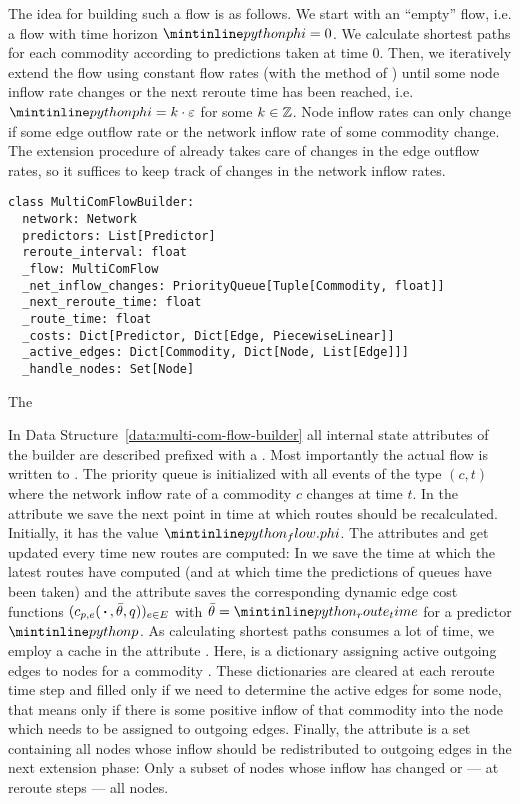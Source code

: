 The idea for building such a flow is as follows.
We start with an ``empty'' flow, i.e. a flow with time horizon $\code{phi}=0$.
We calculate shortest paths for each commodity according to predictions taken at time $0$.
Then, we iteratively extend the flow using constant flow rates (with the  method of )
until some node inflow rate changes or the next reroute time has been reached, i.e. $\code{phi} = k\cdot \varepsilon$ for some $k\in \mathbb{Z}$.
Node inflow rates can only change if some edge outflow rate or the network inflow rate of some commodity change.
The extension procedure of  already takes care of changes in the edge outflow rates, so it suffices to keep track of changes in the network inflow rates.  

\begin{classdef}
  \begin{verbatim}
class MultiComFlowBuilder:
  network: Network
  predictors: List[Predictor]
  reroute_interval: float
  _flow: MultiComFlow
  _net_inflow_changes: PriorityQueue[Tuple[Commodity, float]]
  _next_reroute_time: float
  _route_time: float
  _costs: Dict[Predictor, Dict[Edge, PiecewiseLinear]]
  _active_edges: Dict[Commodity, Dict[Node, List[Edge]]]
  _handle_nodes: Set[Node]
\end{verbatim}
    \caption{The }%
    \label{data:multi-com-flow-builder}
\end{classdef}

In Data Structure~\ref{data:multi-com-flow-builder} all internal state attributes of the builder are described prefixed with a \code{_}.
Most importantly the actual flow is written to .
The priority queue  is initialized with all events of the type $(c, t)$ where the network inflow rate of a commodity $c$ changes at time $t$.
In the attribute  we save the next point in time at which routes should be recalculated.
Initially, it has the value $\code{_flow.phi}$.
The attributes  and  get updated every time new routes are computed:
In  we save the time at which the latest routes have computed (and at which time the predictions of queues have been taken) and the attribute  saves the corresponding dynamic edge cost functions $(c_{p,e}(\,\boldsymbol{\cdot}\,, \bar\theta, q))_{e\in E}$ with $\bar\theta = \code{_route_time}$ for a predictor $\code{p}$.
As calculating shortest paths consumes a lot of time, we employ a cache in the attribute .
Here,  is a dictionary assigning active outgoing edges to nodes for a commodity .
These dictionaries are cleared at each reroute time step and filled only if we need to determine the active edges for some node, that means only if there is some positive inflow of that commodity into the node which needs to be assigned to outgoing edges.
Finally, the attribute  is a set containing all nodes whose inflow should be redistributed to outgoing edges in the next extension phase: Only a subset of nodes whose inflow has changed or — at reroute steps — all nodes.

